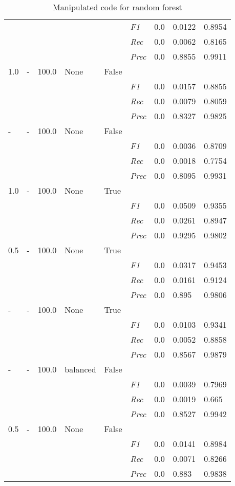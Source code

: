 \begin{table}[]
\begin{tabularx}{\textwidth}{XXXXX|X|X|X|X}
    & & & & & \textit{F1} & 0.0 & 0.0122    & 0.8954    \\
    & & & & & \textit{Rec} &  0.0 & 0.0062 & 0.8165   \\
    & & & & & \textit{Prec} & 0.0 & 0.8855 & 0.9911 \\ \midrule
    1.0 & - & 100.0 & None & False & & & \\
    & & & & & \textit{F1} & 0.0 & 0.0157    & 0.8855    \\
    & & & & & \textit{Rec} &  0.0 & 0.0079 & 0.8059   \\
    & & & & & \textit{Prec} & 0.0 & 0.8327 & 0.9825 \\ \midrule
    - & - & 100.0 & None & False & & & \\
    & & & & & \textit{F1} & 0.0 & 0.0036    & 0.8709    \\
    & & & & & \textit{Rec} &  0.0 & 0.0018 & 0.7754   \\
    & & & & & \textit{Prec} & 0.0 & 0.8095 & 0.9931 \\ \midrule
    1.0 & - & 100.0 & None & True & & & \\
    & & & & & \textit{F1} & 0.0 & 0.0509    & 0.9355    \\
    & & & & & \textit{Rec} &  0.0 & 0.0261 & 0.8947   \\
    & & & & & \textit{Prec} & 0.0 & 0.9295 & 0.9802 \\ \midrule
    0.5 & - & 100.0 & None & True & & & \\
    & & & & & \textit{F1} & 0.0 & 0.0317    & 0.9453    \\
    & & & & & \textit{Rec} &  0.0 & 0.0161 & 0.9124   \\
    & & & & & \textit{Prec} & 0.0 & 0.895 & 0.9806 \\ \midrule
    - & - & 100.0 & None & True & & & \\
    & & & & & \textit{F1} & 0.0 & 0.0103    & 0.9341    \\
    & & & & & \textit{Rec} &  0.0 & 0.0052 & 0.8858   \\
    & & & & & \textit{Prec} & 0.0 & 0.8567 & 0.9879 \\ \midrule
    - & - & 100.0 & balanced & False & & & \\
    & & & & & \textit{F1} & 0.0 & 0.0039    & 0.7969    \\
    & & & & & \textit{Rec} &  0.0 & 0.0019 & 0.665   \\
    & & & & & \textit{Prec} & 0.0 & 0.8527 & 0.9942 \\ \midrule
    0.5 & - & 100.0 & None & False & & & \\
    & & & & & \textit{F1} & 0.0 & 0.0141    & 0.8984    \\
    & & & & & \textit{Rec} &  0.0 & 0.0071 & 0.8266   \\
    & & & & & \textit{Prec} & 0.0 & 0.883 & 0.9838 \\ \midrule
    \end{tabularx}
    \caption{Manipulated code for random forest}
    \label{tab:rq3_random_forest}
    \end{table}
    
